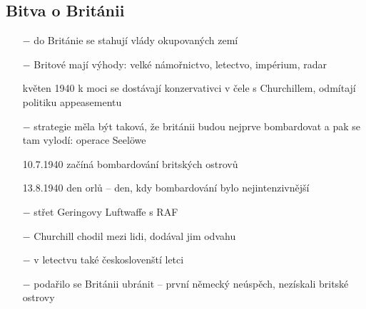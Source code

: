 \documentclass{article}
\begin{document}
\subsection*{Bitva o Británii}
\begin{itemize}
    \vspace{-0.5em}
    \setlength\itemsep{0.15em}
    \item[$-$] do Británie se stahují vlády okupovaných zemí
    \item[$-$] Britové mají výhody: velké námořnictvo, letectvo, impérium, radar
    \item[květen 1940] k moci se dostávají
    konzervativci v čele s Churchillem, odmítají politiku appeasementu
    \item[$-$] strategie měla být taková, že británii budou nejprve bombardovat a pak se tam vylodí: operace Seelöwe
    \item[10.7.1940] začíná bombardování britských ostrovů
    \item[13.8.1940] den orlů -- den, kdy bombardování bylo nejintenzivnější
    \item[$-$] střet Geringovy Luftwaffe s RAF
    \item[$-$] Churchill chodil mezi lidi, dodával jim odvahu
    \item[$-$] v letectvu také českoslovenští letci
    \item[$-$] podařilo se Británii ubránit -- první německý neúspěch, nezískali britské ostrovy  
\end{itemize}
\end{document}
